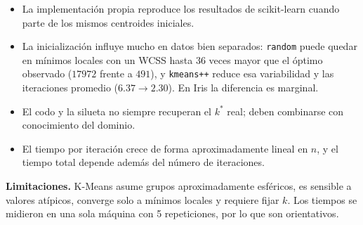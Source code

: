\documentclass[11pt,letterpaper]{article}
\numberwithin{equation}{section}
\theoremstyle{plain}
\begin{document}
\begin{resultado}
\begin{itemize}
  \item La implementación propia reproduce los resultados de scikit-learn cuando parte de los mismos centroides iniciales.
  \item La inicialización influye mucho en datos bien separados: \texttt{random} puede quedar en mínimos locales con un WCSS hasta 36 veces mayor que el óptimo observado ($17972$ frente a $491$), y \texttt{kmeans++} reduce esa variabilidad y las iteraciones promedio ($6.37 \to 2.30$). En Iris la diferencia es marginal.
  \item El codo y la silueta no siempre recuperan el $k^*$ real; deben combinarse con conocimiento del dominio.
  \item El tiempo por iteración crece de forma aproximadamente lineal en $n$, y el tiempo total depende además del número de iteraciones.
\end{itemize}
\end{resultado}

\textbf{Limitaciones.} K-Means asume grupos aproximadamente esféricos, es sensible a valores atípicos, converge solo a mínimos locales y requiere fijar $k$. Los tiempos se midieron en una sola máquina con 5 repeticiones, por lo que son orientativos.
\end{document}
